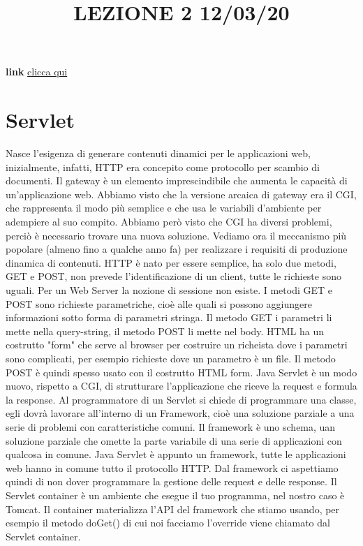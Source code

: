 \title{LEZIONE 2 12/03/20}\newline
\textbf{link} \href{https://web.microsoftstream.com/video/58568b1d-5fc5-41c0-88f6-608e4b8f9f7a}{clicca qui}
\section{Servlet}
Nasce l'esigenza di generare contenuti dinamici per le applicazioni web, inizialmente, infatti, HTTP era concepito come protocollo per scambio di documenti.\newline
Il gateway è un elemento imprescindibile che aumenta le capacità di un'applicazione web. Abbiamo visto che la versione arcaica di gateway era il CGI, che rappresenta il modo più semplice e che usa le variabili d'ambiente per adempiere al suo compito. Abbiamo però visto che CGI ha diversi problemi, perciò è necessario trovare una nuova soluzione.\newline
Vediamo ora il meccanismo più popolare (almeno fino a qualche anno fa) per realizzare i requisiti di produzione dinamica di contenuti. HTTP è nato per essere semplice, ha solo due metodi, GET e POST, non prevede l'identificazione di un client, tutte le richieste sono uguali. Per un Web Server la nozione di sessione non esiste. I metodi GET e POST sono richieste parametriche, cioè alle quali si possono aggiungere informazioni sotto forma di parametri stringa. Il metodo GET i parametri li mette nella query-string, il metodo POST li mette nel body. HTML ha un costrutto "form" che serve al browser per costruire un richeista dove i parametri sono complicati, per esempio richieste dove un parametro è un file. Il metodo POST è quindi spesso usato con il costrutto HTML form.\newline
Java Servlet è un modo nuovo, rispetto a CGI, di strutturare l'applicazione che riceve la request e formula la response.\newline
Al programmatore di un Servlet si chiede di programmare una classe, egli dovrà lavorare all'interno di un Framework, cioè una soluzione parziale a una serie di problemi con caratteristiche comuni. Il framework è uno schema, uan soluzione parziale che omette la parte variabile di una serie di applicazioni con qualcosa in comune. Java Servlet è appunto un framework, tutte le applicazioni web hanno in comune tutto il protocollo HTTP. Dal framework ci aspettiamo quindi di non dover programmare la gestione delle request e delle response.\newline
Il Servlet container è un ambiente che esegue il tuo programma, nel nostro caso è Tomcat. Il container materializza l'API del framework che stiamo usando, per esempio il metodo doGet() di cui noi facciamo l'override viene chiamato dal Servlet container.\newline
